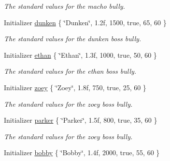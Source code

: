 \begin{DoxyCompactItemize}
\begin{DoxyCompactList}\small\item\em The standard values for the macho bully. \end{DoxyCompactList}\item 
\hypertarget{class_enemy_a0054c724f94ef37d4e82d274d5aa6808}{Initializer \hyperlink{class_enemy_a0054c724f94ef37d4e82d274d5aa6808}{dunken} \{ \char`\"{}Dunken\char`\"{}, 1.\+2f, 1500, true, 65, 60 \}}\label{class_enemy_a0054c724f94ef37d4e82d274d5aa6808}

\begin{DoxyCompactList}\small\item\em The standard values for the dunken boss bully. \end{DoxyCompactList}\item 
\hypertarget{class_enemy_ae1c2e8a37b9d60c81a670c30bf523576}{Initializer \hyperlink{class_enemy_ae1c2e8a37b9d60c81a670c30bf523576}{ethan} \{ \char`\"{}Ethan\char`\"{}, 1.\+3f, 1000, true, 50, 60 \}}\label{class_enemy_ae1c2e8a37b9d60c81a670c30bf523576}

\begin{DoxyCompactList}\small\item\em The standard values for the ethan boss bully. \end{DoxyCompactList}\item 
\hypertarget{class_enemy_a05a3bacef0c241d5bc435d3b2cad0640}{Initializer \hyperlink{class_enemy_a05a3bacef0c241d5bc435d3b2cad0640}{zoey} \{ \char`\"{}Zoey\char`\"{}, 1.\+8f, 750, true, 25, 60 \}}\label{class_enemy_a05a3bacef0c241d5bc435d3b2cad0640}

\begin{DoxyCompactList}\small\item\em The standard values for the zoey boss bully. \end{DoxyCompactList}\item 
\hypertarget{class_enemy_a661e8dd9770b13638cb18572abf84ab3}{Initializer \hyperlink{class_enemy_a661e8dd9770b13638cb18572abf84ab3}{parker} \{ \char`\"{}Parker\char`\"{}, 1.\+5f, 800, true, 35, 60 \}}\label{class_enemy_a661e8dd9770b13638cb18572abf84ab3}

\begin{DoxyCompactList}\small\item\em The standard values for the zoey boss bully. \end{DoxyCompactList}\item 
\hypertarget{class_enemy_a8a6d90afa0b9b58c11dd63487cea981e}{Initializer \hyperlink{class_enemy_a8a6d90afa0b9b58c11dd63487cea981e}{bobby} \{ \char`\"{}Bobby\char`\"{}, 1.\+4f, 2000, true, 55, 60 \}}\label{class_enemy_a8a6d90afa0b9b58c11dd63487cea981e}


\end{DoxyCompactItemize}
